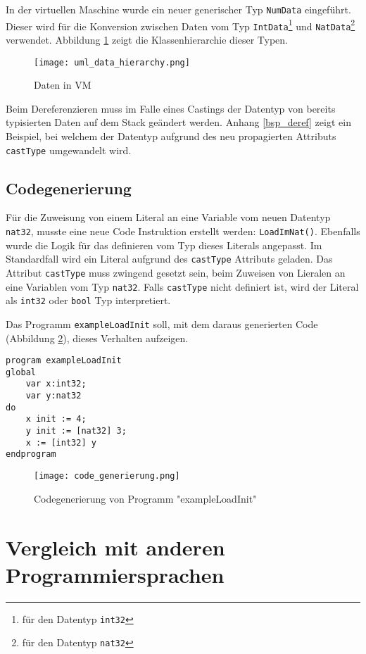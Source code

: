 \documentclass[10pt, a4paper, twocolumn]{article} %
\begin{document}
In der virtuellen Maschine wurde ein neuer generischer Typ \texttt{NumData} eingeführt.
Dieser wird für die Konversion zwischen Daten vom Typ \texttt{IntData}\footnote{für den Datentyp \texttt{int32}} und \texttt{NatData}\footnote{für den Datentyp \texttt{nat32}} verwendet.
Abbildung \ref{data_hierarchy} zeigt die Klassenhierarchie dieser Typen.

\begin{figure}[H]
    \texttt{[image: uml\_data\_hierarchy.png]} %
    \caption{Daten in VM} %
    \label{data_hierarchy}
\end{figure}

Beim Dereferenzieren muss im Falle eines Castings der Datentyp von bereits typisierten Daten auf dem Stack geändert werden.
Anhang \ref{bsp_deref} zeigt ein Beispiel, bei welchem der Datentyp aufgrund des neu propagierten Attributs \texttt{castType} umgewandelt wird.

\subsection{Codegenerierung}
Für die Zuweisung von einem Literal an eine Variable vom neuen Datentyp \texttt{nat32}, musste eine neue Code Instruktion erstellt werden: \texttt{LoadImNat()}.
Ebenfalls wurde die Logik für das definieren vom Typ dieses Literals angepasst.
Im Standardfall wird ein Literal aufgrund des \texttt{castType} Attributs geladen.
Das Attribut \texttt{castType} muss zwingend gesetzt sein, beim Zuweisen von Lieralen an eine Variablen vom Typ \texttt{nat32}.
Falls \texttt{castType} nicht definiert ist, wird der Literal als \texttt{int32} oder \texttt{bool} Typ interpretiert.

Das Programm \texttt{exampleLoadInit} soll, mit dem daraus generierten Code (Abbildung \ref{codegenerierung}), dieses Verhalten aufzeigen.
\begin{lstlisting}
program exampleLoadInit
global
    var x:int32;
    var y:nat32
do
    x init := 4;
    y init := [nat32] 3;
    x := [int32] y
endprogram
\end{lstlisting}

\begin{figure}[H]
    \texttt{[image: code\_generierung.png]}
    \caption{Codegenerierung von Programm "exampleLoadInit"}
    \label{codegenerierung}
\end{figure}

\section{Vergleich mit anderen Programmiersprachen}
\end{document}

